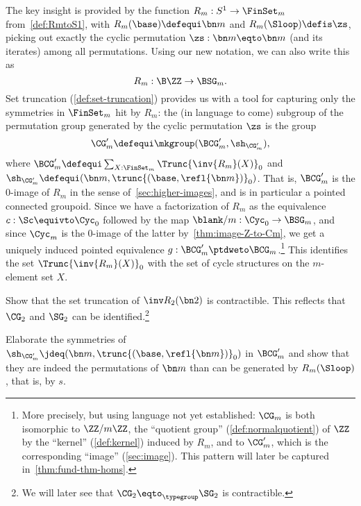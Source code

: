 \begin{example}
The key insight is provided by the function $R_m:S^1\to\FinSet_m$ from~\cref{def:RmtoS1},
with $R_m(\base)\defequi\bn m$ and
$R_m(\Sloop)\defis \zs$, picking out exactly the cyclic permutation
$\zs:\bn m\eqto \bn m$ (and its iterates) among all permutations.
Using our new notation, we can also write this as
\[
  R_m : \B\ZZ \to \BSG_m.
\]
Set truncation (\cref{def:set-truncation}) provides us with a tool for capturing only the symmetries in $\FinSet_m$ hit by $R_m$:
the (in language to come) subgroup of the permutation group generated by the cyclic permutation $\zs$ is the group
\[
  \CG'_m\defequi\mkgroup(\BCG'_m,\sh_{\CG'_m}),
\]
where $\BCG'_m\defequi \sum_{X:\FinSet_m}\Trunc{\inv{R_m}(X)}_0$
and $\sh_{\CG'_m}\defequi (\bn m,\trunc{(\base,\refl{\bn m})}_0)$.
That is, $\BCG'_m$ is the $0$-image of $R_m$ in the sense 
of~\cref{sec:higher-images},
and is in particular a pointed connected groupoid.
Since we have a factorization of $R_m$ as the equivalence $c:\Sc\equivto\Cyc_0$
followed by the map $\blank/m:\Cyc_0 \to \BSG_m$,
and since $\Cyc_m$ is the $0$-image of the latter by~\cref{thm:image-Z-to-Cm},
we get a uniquely induced pointed equivalence $g : \BCG'_m \ptdweto \BCG_m$.\footnote{%
  More precisely, but using language not yet established: $\CG_m$ is both isomorphic to $\ZZ/m\ZZ$, the ``quotient group'' (\cf \cref{def:normalquotient}) of $\ZZ$ by the ``kernel'' (\cf \cref{def:kernel}) induced by $R_m$, and to $\CG'_m$, which is the corresponding ``image'' (\cf \cref{sec:image}). This pattern will later be captured in~\cref{thm:fund-thm-homs}.}
This identifies the set $\Trunc{\inv{R_m}(X)}_0$ with the set of 
cycle structures on the $m$-element set $X$.
\end{example}

\begin{xca}\label{xca:CG2isSG2}
Show that the set truncation of $\inv R_2(\bn 2)$ is contractible.
This reflects that $\CG_2$ and $\SG_2$ can be identified.\footnote{%
We will later see that $\CG_2\eqto_\typegroup\SG_2$ is contractible.}
\end{xca}
\begin{xca}\label{xca:RmloopCGm}
Elaborate the symmetries of
$\sh_{\CG'_m}\jdeq (\bn m,\trunc{(\base,\refl{\bn m})}_0)$
in $\BCG'_m$ and show that they are indeed the permutations of $\bn m$
than can be generated by $R_m(\Sloop)$, that is, by $s$. 
\end{xca}

